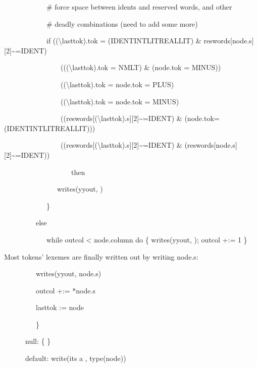 {\ttfamily\mdseries
\ \ \ \ \ \ \ \ \ \ \ \ \# force space between idents and reserved words, and other}

{\ttfamily\mdseries
\ \ \ \ \ \ \ \ \ \ \ \ \# deadly combinations (need to add some more)}

{\ttfamily\mdseries
\ \ \ \ \ \ \ \ \ \ \ \ if (({\textbackslash}lasttok).tok = (IDENT{\textbar}INTLIT{\textbar}REALLIT) \&
reswords[node.s][2]\~{}=IDENT){\textbar}}

{\ttfamily\mdseries
\ \ \ \ \ \ \ \ \ \ \ \ \ \ \ \ ((({\textbackslash}lasttok).tok = NMLT) \& (node.tok = MINUS)) {\textbar}}

{\ttfamily\mdseries
\ \ \ \ \ \ \ \ \ \ \ \ \ \ \ \ (({\textbackslash}lasttok).tok = node.tok = PLUS) {\textbar}}

{\ttfamily\mdseries
\ \ \ \ \ \ \ \ \ \ \ \ \ \ \ \ (({\textbackslash}lasttok).tok = node.tok = MINUS) {\textbar}}

{\ttfamily\mdseries
\ \ \ \ \ \ \ \ \ \ \ \ \ \ \ \ ((reswords[({\textbackslash}lasttok).s][2]\~{}=IDENT) \&
(node.tok=(IDENT{\textbar}INTLIT{\textbar}REALLIT))){\textbar}}

{\ttfamily\mdseries
\ \ \ \ \ \ \ \ \ \ \ \ \ \ \ \ ((reswords[({\textbackslash}lasttok).s][2]\~{}=IDENT) \&
(reswords[node.s][2]\~{}=IDENT))}

{\ttfamily\mdseries
\ \ \ \ \ \ \ \ \ \ \ \ \ \ \ \ \ \ \ then}

{\ttfamily\mdseries
\ \ \ \ \ \ \ \ \ \ \ \ \ \ \ writes(yyout, {\textquotedbl} {\textquotedbl})}

{\ttfamily\mdseries
\ \ \ \ \ \ \ \ \ \ \ \ \}}

{\ttfamily\mdseries
\ \ \ \ \ \ \ \ \ else}

{\ttfamily\mdseries
\ \ \ \ \ \ \ \ \ \ \ \ while outcol {\textless} node.column do \{ writes(yyout, {\textquotedbl} {\textquotedbl});
outcol +:= 1 \}}


Most tokens' lexemes are finally written out by writing node.s: 

{\ttfamily\mdseries
\ \ \ \ \ \ \ \ \ writes(yyout, node.s)}

{\ttfamily\mdseries
\ \ \ \ \ \ \ \ \ outcol +:= *node.s}

{\ttfamily\mdseries
\ \ \ \ \ \ \ \ \ lasttok := node}

{\ttfamily\mdseries
\ \ \ \ \ \ \ \ \ \}}

{\ttfamily\mdseries
\ \ \ \ \ \ {\textquotedbl}null{\textquotedbl}: \{ \}}

{\ttfamily\mdseries
\ \ \ \ \ \ default: write({\textquotedbl}its a {\textquotedbl}, type(node))}

